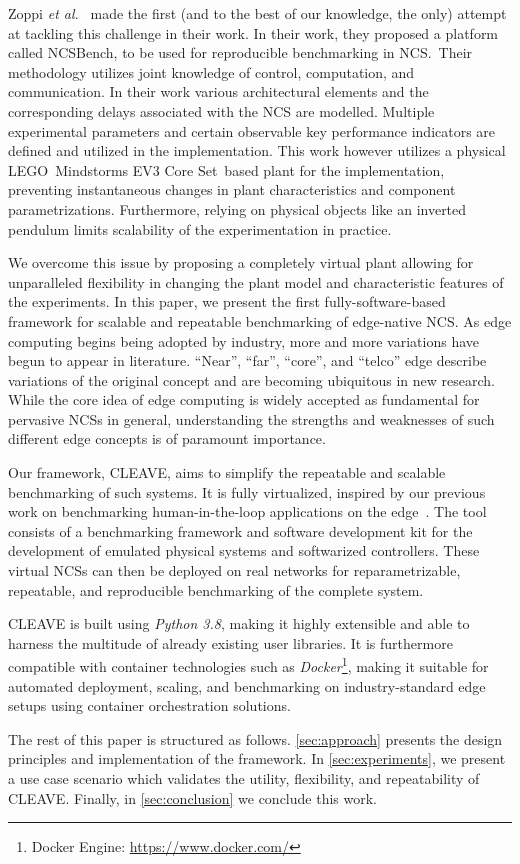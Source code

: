 Zoppi \emph{et al.}~\cite{Zoppi2020NCSBench} made the first (and to the best of our knowledge, the only) attempt at tackling this challenge in their work.
In their work, they proposed a platform called NCSBench, to be used for reproducible benchmarking in NCS.\ 
Their methodology utilizes joint knowledge of control, computation, and communication. 
In their work various architectural elements and the corresponding delays associated with the NCS are modelled. 
Multiple experimental parameters and certain observable key performance indicators are defined and utilized in the implementation. 
This work however utilizes a physical LEGO\textregistered{}\ Mindstorms EV3 Core Set\texttrademark{}\  based plant for the implementation, preventing instantaneous changes in plant characteristics and component parametrizations.
Furthermore, relying on physical objects like an inverted pendulum limits scalability of the experimentation in practice. 

We overcome this issue by proposing a completely virtual plant allowing for unparalleled flexibility in changing the plant model and characteristic features of the experiments.
In this paper, we present the first fully-software-based framework for scalable and repeatable benchmarking of edge-native \gls{NCS}.
As edge computing begins being adopted by industry, more and more variations have begun to appear in literature.
``Near'', ``far'', ``core'', and ``telco'' edge describe variations of the original concept and are becoming ubiquitous in new research.
While the core idea of edge computing is widely accepted as fundamental for pervasive \acp{NCS} in general, understanding the strengths and weaknesses of such different edge concepts is of paramount importance.

Our framework, \gls{CLEAVE}, aims to simplify the repeatable and scalable benchmarking of such systems.
It is fully virtualized, inspired by our previous work on benchmarking human-in-the-loop applications on the edge~\cite{Olguin2019EdgeDroid}.
The tool consists of a benchmarking framework and software development kit for the development of emulated physical systems and softwarized controllers.
These virtual \acp{NCS} can then be deployed on real networks for reparametrizable, repeatable, and reproducible benchmarking of the complete system.

\gls{CLEAVE} is built using \emph{Python 3.8}, making it highly extensible and able to harness the multitude of already existing user libraries.
It is furthermore compatible with container technologies such as \emph{Docker}\footnote{Docker Engine: \url{https://www.docker.com/}}, making it suitable for automated deployment, scaling, and benchmarking on industry-standard edge setups using container orchestration solutions.

The rest of this paper is structured as follows.
\cref{sec:approach} presents the design principles and implementation of the framework.
In \cref{sec:experiments}, we present a use case scenario which validates the utility, flexibility, and repeatability of \gls{CLEAVE}.
Finally, in \cref{sec:conclusion} we conclude this work.